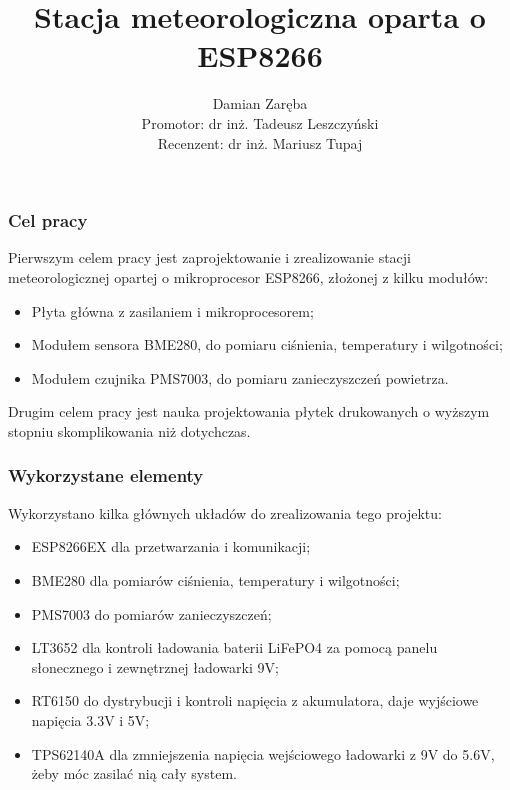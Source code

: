 \documentclass{beamer}
\title{Stacja meteorologiczna oparta o ESP8266}
\author[Damian Zaręba]{Damian Zaręba \\[5mm]{\tiny{Promotor: dr inż. Tadeusz Leszczyński \\ Recenzent: dr inż. Mariusz Tupaj}}}
\institute[PWSZ Ciechanów]{Państwowa Wyższa Szkoła Zawodowa w Ciechanowie, Zamiejscowy Wydział Elektroniki, Dziennikarstwa i Technik Multimedialnych w Mławie}
\date{}
\begin{document}
	
	\frame{\maketitle}
	\begin{frame}
	\frametitle{Cel pracy}
		Pierwszym celem pracy jest zaprojektowanie i zrealizowanie stacji meteorologicznej opartej o mikroprocesor ESP8266, złożonej z kilku modułów:
		\begin{itemize}
			\item Płyta główna z zasilaniem i mikroprocesorem;
			\item Modułem sensora BME280, do pomiaru ciśnienia, temperatury i wilgotności;
			\item Modułem czujnika PMS7003, do pomiaru zanieczyszczeń powietrza.
		\end{itemize}
	Drugim celem pracy jest nauka projektowania płytek drukowanych o wyższym stopniu skomplikowania niż dotychczas.
	\end{frame}
\begin{frame}
	\frametitle{Wykorzystane elementy}
	Wykorzystano kilka głównych układów do zrealizowania tego projektu:
	\begin{itemize}
		\item ESP8266EX dla przetwarzania i komunikacji;
		\item BME280 dla pomiarów ciśnienia, temperatury i wilgotności;
		\item PMS7003 do pomiarów zanieczyszczeń;
		\item LT3652 dla kontroli ładowania baterii LiFePO4 za pomocą panelu słonecznego i zewnętrznej ładowarki 9V;
		\item RT6150 do dystrybucji i kontroli napięcia z akumulatora, daje wyjściowe napięcia 3.3V i 5V;
		\item TPS62140A dla zmniejszenia napięcia wejściowego ładowarki z 9V do 5.6V, żeby móc zasilać nią cały system.
		\end{itemize}
\end{frame}
\end{document}
